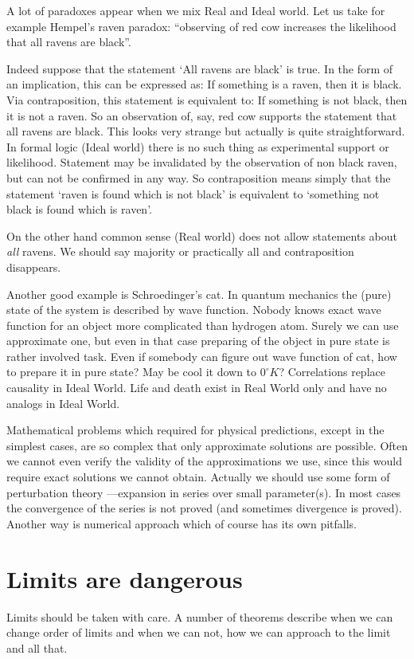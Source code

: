 A lot of paradoxes appear when we mix Real and Ideal world. 
Let us take for example  Hempel's raven paradox: ``observing
of red cow increases the likelihood 
that all ravens are black''. 

Indeed suppose that the statement `All ravens are black' is true.
In the form of an 
implication, this can be expressed as: If something is a raven, then it 
is black. Via contraposition, this statement is equivalent to: If something is 
not black, then it is not a raven. So an observation of, say, red cow supports 
the statement that all ravens are black. This looks very strange but actually is quite
straightforward. In formal logic (Ideal world) there is no such thing as experimental support or
likelihood. Statement may be invalidated by the observation of non black raven, 
but can not be confirmed in any way. So contraposition means simply that the 
statement `raven is found which is not black' is equivalent to 
`something not black is found which is raven'. 

On the other hand common sense (Real world) does not allow statements about 
{\em all} ravens. We should say majority or practically all 
and  contraposition  disappears.

Another good example is Schroedinger's cat. In quantum mechanics the (pure) state of the system is described 
by wave function. Nobody knows exact wave function for an object more complicated than hydrogen atom. 
Surely we can use approximate one, but even in that case preparing of the object in pure state
is rather involved task.  Even if somebody can figure out wave function of cat, how to prepare it
in pure state? May be cool it down to $0^\circ K$? Correlations replace causality in Ideal World.
 Life and death exist in Real World only and have no analogs in Ideal World.

Mathematical problems which required for physical predictions, except in the simplest cases, are so complex that only approximate solutions are possible. 
Often we cannot even verify the validity of the approximations we use,
since this would require exact solutions we cannot obtain. Actually we should 
use some form of perturbation theory ---expansion in series over small parameter(s). 
In most cases the convergence of the series is not proved (and sometimes divergence is proved). 
Another way is numerical approach which of course has its own pitfalls.

\section{Limits are dangerous}
\label{limits}
Limits should be taken with care. A number of theorems describe 
when we can change order of limits and when we can not, how
we can approach to the limit and all that.

